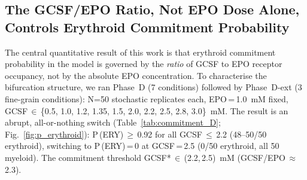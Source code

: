 
\subsection{The GCSF/EPO Ratio, Not EPO Dose Alone, Controls Erythroid Commitment Probability}
\label{sec:ratio_sweep}

The central quantitative result of this work is that erythroid commitment probability in the model is governed by the \emph{ratio} of GCSF to EPO receptor occupancy, not by the absolute EPO concentration. To characterise the bifurcation structure, we ran Phase~D (7 conditions) followed by Phase~D-ext (3 fine-grain conditions): N=50 stochastic replicates each, EPO\,=\,1.0~mM fixed, GCSF\,$\in$\,\{0.5, 1.0, 1.2, 1.35, 1.5, 2.0, 2.2, 2.5, 2.8, 3.0\}~mM. The result is an abrupt, all-or-nothing switch (Table~\ref{tab:commitment_D}; Fig.~\ref{fig:p_erythroid}): P\,(ERY)\,$\geq$\,0.92 for all GCSF\,$\leq$\,2.2 (48--50/50 erythroid), switching to P\,(ERY)\,=\,0 at GCSF\,=\,2.5 (0/50 erythroid, all 50 myeloid). The commitment threshold GCSF*\,$\in$\,(2.2,\,2.5)~mM (GCSF/EPO\,$\approx$\,2.3).

